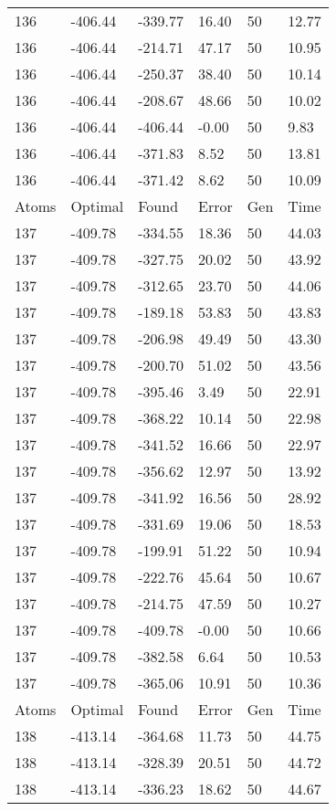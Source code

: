 \documentclass{report}
\begin{document}
\begin{appendix}
\begin{longtable}{llllll}
136 & -406.44 & -339.77 & 16.40 & 50 & 12.77 \\
136 & -406.44 & -214.71 & 47.17 & 50 & 10.95 \\
136 & -406.44 & -250.37 & 38.40 & 50 & 10.14 \\
136 & -406.44 & -208.67 & 48.66 & 50 & 10.02 \\
136 & -406.44 & -406.44 & -0.00 & 50 & 9.83 \\
136 & -406.44 & -371.83 & 8.52 & 50 & 13.81 \\
136 & -406.44 & -371.42 & 8.62 & 50 & 10.09 \\
Atoms & Optimal & Found & Error & Gen & Time \\
137 & -409.78 & -334.55 & 18.36 & 50 & 44.03 \\
137 & -409.78 & -327.75 & 20.02 & 50 & 43.92 \\
137 & -409.78 & -312.65 & 23.70 & 50 & 44.06 \\
137 & -409.78 & -189.18 & 53.83 & 50 & 43.83 \\
137 & -409.78 & -206.98 & 49.49 & 50 & 43.30 \\
137 & -409.78 & -200.70 & 51.02 & 50 & 43.56 \\
137 & -409.78 & -395.46 & 3.49 & 50 & 22.91 \\
137 & -409.78 & -368.22 & 10.14 & 50 & 22.98 \\
137 & -409.78 & -341.52 & 16.66 & 50 & 22.97 \\
137 & -409.78 & -356.62 & 12.97 & 50 & 13.92 \\
137 & -409.78 & -341.92 & 16.56 & 50 & 28.92 \\
137 & -409.78 & -331.69 & 19.06 & 50 & 18.53 \\
137 & -409.78 & -199.91 & 51.22 & 50 & 10.94 \\
137 & -409.78 & -222.76 & 45.64 & 50 & 10.67 \\
137 & -409.78 & -214.75 & 47.59 & 50 & 10.27 \\
137 & -409.78 & -409.78 & -0.00 & 50 & 10.66 \\
137 & -409.78 & -382.58 & 6.64 & 50 & 10.53 \\
137 & -409.78 & -365.06 & 10.91 & 50 & 10.36 \\
Atoms & Optimal & Found & Error & Gen & Time \\
138 & -413.14 & -364.68 & 11.73 & 50 & 44.75 \\
138 & -413.14 & -328.39 & 20.51 & 50 & 44.72 \\
138 & -413.14 & -336.23 & 18.62 & 50 & 44.67 \\

\end{longtable}
\end{appendix}
\end{document}
